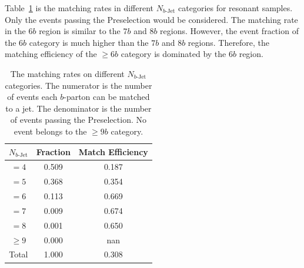 \documentclass[12pt]{article}
\begin{document}
    Table~\ref{tab:resonant_match_rate_nbj_9b} is the matching rates in different $N_{b\text{-Jet}}$ categories for resonant samples. Only the events passing the Preselection would be considered. The matching rate in the $6b$ region is similar to the $7b$ and $8b$ regions. However, the event fraction of the $6b$ category is much higher than the $7b$ and $8b$ regions. Therefore, the matching efficiency of the $\ge 6b$ category is dominated by the $6b$ region. 
    \begin{table}[htpb]
		\centering
        \caption{The matching rates on different $N_{b\text{-Jet}}$ categories. The numerator is the number of events each $b$-parton can be matched to a jet. The denominator is the number of events passing the Preselection. No event belongs to the $\ge 9b$ category.}
		\label{tab:resonant_match_rate_nbj_9b}
		\begin{tabular}{c|c|c}
        $N_{b\text{-Jet}}$    & Fraction  & Match Efficiency     \\ \hline
        $=4$                  & 0.509 & 0.187 \\
        $=5$                  & 0.368 & 0.354 \\
        $=6$                  & 0.113 & 0.669 \\
        $=7$                  & 0.009 & 0.674 \\
        $=8$                  & 0.001 & 0.650 \\
        $\ge 9$               & 0.000 & nan   \\ \hline
        Total                 & 1.000 & 0.308
		\end{tabular}
	\end{table}
    
\end{document}

